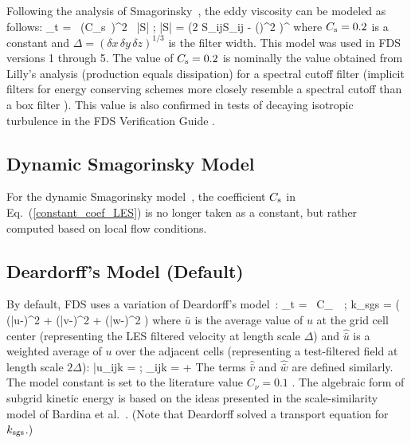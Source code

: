Following the analysis of Smagorinsky~\cite{Smagorinsky:1}, the eddy viscosity can be modeled as follows:
\be
\mu_t = \rho \, (C_{\rm s}\, \Delta)^2 \, |S| \label{constant_coef_LES} \quad ; \quad |S| = \left(2 S_{ij}S_{ij} -  (\nabla\!\cdot \bu)^2 \right)^\ha
\ee
where $C_{\rm s}=0.2$ is a constant and $\Delta = (\delta x \, \delta y \, \delta z)^{1/3}$ is the filter width. This model was used in FDS versions 1 through 5.  The value of $C_{\rm s}=0.2$ is nominally the value obtained from Lilly's analysis \cite{Lilly:1967} (production equals dissipation) for a spectral cutoff filter (implicit filters for energy conserving schemes more closely resemble a spectral cutoff than a box filter \cite{McDermott:2005b}).  This value is also confirmed in tests of decaying isotropic turbulence in the FDS Verification Guide \cite{FDS_Verification_Guide}.

\subsection{Dynamic Smagorinsky Model}

For the dynamic Smagorinsky model~\cite{Germano:1,Moin:1991}, the coefficient $C_{\rm s}$ in Eq.~(\ref{constant_coef_LES}) is no longer taken as a constant, but rather computed based on local flow conditions.

\subsection{Deardorff's Model (Default)}
\label{sec:deardorff}

By default, FDS uses a variation of Deardorff's model~\cite{Deardorff:1980}:
\be
  \mu_{\rm t} = \rho \, C_\nu \, \Delta \,  \quad ; \quad
  k_{\rm sgs} = \ha \left( (\bar{u}-)^2 + (\bar{v}-)^2 + (\bar{w}-)^2 \right)  \label{Deardorff_LES}
\ee
where $\bar{u}$ is the average value of $u$ at the grid cell center (representing the LES filtered velocity at length scale $\Delta$) and $\hat{\bar{u}}$ is a weighted average of $u$ over the adjacent cells (representing a test-filtered field at length scale $2\Delta$):
\be
   \bar{u}_{ijk} =  \quad ; \quad {}_{ijk} =  + 
\ee
The terms $\hat{\bar{v}}$ and $\hat{\bar{w}}$ are defined similarly.  The model constant is set to the literature value $C_\nu=0.1$ \cite{Pope:2000}.  The algebraic form of subgrid kinetic energy is based on the ideas presented in the scale-similarity model of Bardina et al.~\cite{Bardina:1980}. (Note that Deardorff \cite{Deardorff:1980} solved a transport equation for $k_{\rm sgs}$.)

